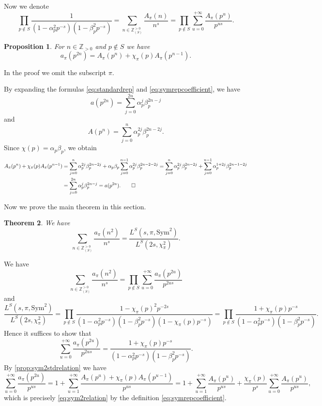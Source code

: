 \documentclass[10pt,oneside,reqno]{amsart}
\makeatletter
\newcommand\ZZ{\mathbb{Z}}
\newcommand\Sym{\mathrm{Sym}}
\theoremstyle{THEOREM}
\newtheorem{theorem}{Theorem}[section]
\newtheorem{proposition}[theorem]{Proposition}
\theoremstyle{DEFINITION}
\theoremstyle{EXERCISE}
\numberwithin{equation}{section}
\renewenvironment{proof}[1][\proofname]{\par
  \vspace{-6pt}
  \pushQED{\qed}
  \normalfont \topsep6\p@\@plus6\p@\relax
  \trivlist
  \item[\hskip\labelsep\rmfamily\bfseries
    #1\@addpunct{:}]\ignorespaces
}{
  \popQED\endtrivlist\@endpefalse
  \vspace{-6pt}
}
\makeatother
\begin{document}
Now we denote
\begin{equation}\label{eq:symrepcoefficient}
\prod_{p\notin S}\frac{1}{(1-\alpha_p^2p^{-s})(1-\beta_p^2p^{-s})}=\sum_{n\in \ZZ_{(S)}^{>0}}\frac{A_\pi(n)}{n^s}=\prod_{p\notin S}\sum_{u=0}^{+\infty}\frac{A_\pi(p^u)}{p^{us}}.
\end{equation}

\begin{proposition}\label{prop:sym2stdrelation}
For $n\in \ZZ_{>0}$ and $p\notin S$ we have
\[
a_\pi(p^{2n})=A_\pi(p^n)+\chi_\pi(p)A_\pi(p^{n-1}).
\]
\end{proposition}
\begin{proof}
In the proof we omit the subscript $\pi$.

By expanding the formulas \eqref{eq:standardrep} and \eqref{eq:symrepcoefficient}, we have
\[
a(p^{2n})=\sum_{j=0}^{2n}\alpha_p^j\beta_p^{2n-j}
\]
and 
\[
A(p^n)=\sum_{j=0}^{n}\alpha_p^{2j}\beta_p^{2n-2j}.
\]
Since $\chi(p)=\alpha_p\beta_p$, we obtain
\begin{align*}
A_\pi(p^n)+\chi_\pi(p)A_\pi(p^{n-1})&=\sum_{j=0}^{n}\alpha_p^{2j}\beta_p^{2n-2j}+ \alpha_p\beta_p\sum_{j=0}^{n-1}\alpha_p^{2j}\beta_p^{2n-2-2j}=\sum_{j=0}^{n}\alpha_p^{2j}\beta_p^{2n-2j}+ \sum_{j=0}^{n-1}\alpha_p^{1+2j}\beta_p^{2n-1-2j}\\
&=\sum_{j=0}^{2n}\alpha_p^j\beta_p^{2n-j}=a(p^{2n}).\qedhere
\end{align*}
\end{proof}

Now we prove the main theorem in this section.
\begin{theorem}
We have
\[
\sum_{n\in \ZZ_{(S)}^{>0}}\frac{a_\pi(n^2)}{n^s}=\frac{L^S(s,\pi,\Sym^2)}{L^S(2s,\chi_\pi^2)}.
\]
\end{theorem}
\begin{proof}
We have
\[
\sum_{n\in \ZZ_{(S)}^{>0}}\frac{a_\pi(n^2)}{n^s}=\prod_{p\notin S}\sum_{u=0}^{+\infty}\frac{a_\pi(p^{2u})}{p^{2us}}
\]
and
\[
\frac{L^S(s,\pi,\Sym^2)}{L^S(2s,\chi_\pi^2)}=\prod_{p\notin S}\frac{1-\chi_\pi(p)^2p^{-2s}}{(1-\alpha_p^2p^{-s})(1-\beta_p^2p^{-s})(1-\chi_\pi(p)p^{-s})}= \prod_{p\notin S}\frac{1+\chi_\pi(p)p^{-s}}{(1-\alpha_p^2p^{-s})(1-\beta_p^2p^{-s})}.
\]
Hence it suffices to show that
\begin{equation}\label{eq:sym2relation}
\sum_{u=0}^{+\infty}\frac{a_\pi(p^{2u})}{p^{2us}}=\frac{1+\chi_\pi(p)p^{-s}}{(1-\alpha_p^2p^{-s})(1-\beta_p^2p^{-s})}.
\end{equation}
By \autoref{prop:sym2stdrelation} we have
\[
\sum_{u=0}^{+\infty}\frac{a_\pi(p^{2u})}{p^{us}}= 1+\sum_{u=1}^{+\infty}\frac{A_\pi(p^u)+\chi_\pi(p)A_\pi(p^{u-1})}{p^{us}}=1+ \sum_{u=1}^{+\infty}\frac{A_\pi(p^u)}{p^{us}}+\frac{\chi_\pi(p)}{p^s}\sum_{u=0}^{+\infty} \frac{A_\pi(p^{u})}{p^{us}},
\]
which is precisely \eqref{eq:sym2relation} by the definition \eqref{eq:symrepcoefficient}.
\end{proof}
\end{document}
